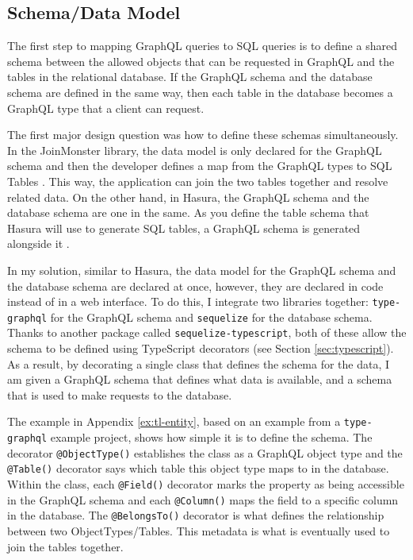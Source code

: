 \subsection{Schema/Data Model}\label{sec:schema}

The first step to mapping GraphQL queries to SQL queries is to define a shared schema between the allowed objects that can be requested in GraphQL and the tables in the relational database.  If the GraphQL schema and the database schema are defined in the same way, then each table in the database becomes a GraphQL type that a client can request.

The first major design question was how to define these schemas simultaneously.  In the JoinMonster library, the data model is only declared for the GraphQL schema and then the developer defines a map from the GraphQL types to SQL Tables \cite{carlJoinMonster}.  This way, the application can join the two tables together and resolve related data.  On the other hand, in Hasura, the GraphQL schema and the database schema are one in the same.  As you define the table schema that Hasura will use to generate SQL tables, a GraphQL schema is generated alongside it \cite{hasurainc.HasuraGraphQLEngine}.

In my solution, similar to Hasura, the data model for the GraphQL schema and the database schema are declared at once, however, they are declared in code instead of in a web interface.  To do this, I integrate two libraries together: \Verb!type-graphql! for the GraphQL schema and \Verb!sequelize! for the database schema.  Thanks to another package called \Verb!sequelize-typescript!, both of these allow the schema to be defined using TypeScript decorators (see Section \ref{sec:typescript}).  As a result, by decorating a single class that defines the schema for the data, I am given a GraphQL schema that defines what data is available, and a schema that is used to make requests to the database.

The example in Appendix \ref{ex:tl-entity}, based on an example from a \Verb!type-graphql! example project, shows how simple it is to define the schema.  The decorator \Verb!@ObjectType()! establishes the class as a GraphQL object type and the \Verb!@Table()! decorator says which table this object type maps to in the database.  Within the class, each \Verb!@Field()! decorator marks the property as being accessible in the GraphQL schema and each \Verb!@Column()! maps the field to a specific column in the database.  The \Verb!@BelongsTo()! decorator is what defines the relationship between two ObjectTypes/Tables.  This metadata is what is eventually used to join the tables together.